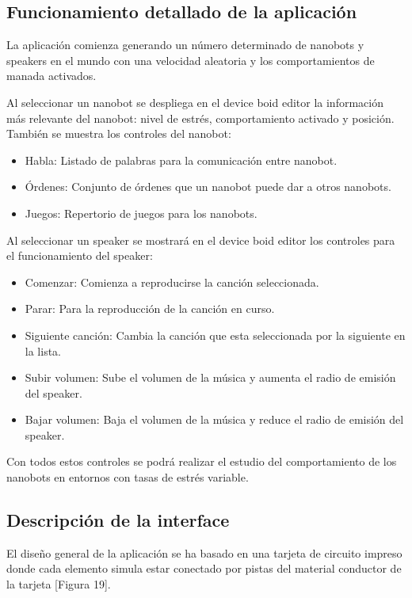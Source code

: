 \subsection{Funcionamiento detallado de la aplicación}
\label{sec:funcionamiento_aplicacion}
La aplicación comienza generando un número determinado de nanobots y speakers en el mundo con una velocidad aleatoria y los comportamientos de manada activados. 

Al seleccionar un nanobot se despliega en el device boid editor la información más relevante del nanobot: nivel de estrés, comportamiento activado y posición. También se muestra los controles del nanobot: 
\begin{itemize}
 \item Habla: Listado de palabras para la comunicación entre nanobot.
 \item Órdenes: Conjunto de órdenes que un nanobot puede dar a otros nanobots.
 \item Juegos: Repertorio de juegos para los nanobots.
\end{itemize}

Al seleccionar un speaker se mostrará en el device boid editor los controles para el funcionamiento del speaker:
\begin{itemize}
 \item Comenzar: Comienza a reproducirse la canción seleccionada.
 \item Parar: Para la reproducción de la canción en curso.
 \item Siguiente canción: Cambia la canción que esta seleccionada por la siguiente en la lista.
 \item Subir volumen: Sube el volumen de la música y aumenta el radio de emisión del speaker.
 \item Bajar volumen: Baja el volumen de la música y reduce el radio de emisión del speaker.
\end{itemize}

Con todos estos controles se podrá realizar el estudio del comportamiento de los nanobots en entornos con tasas de estrés variable.

\subsection{Descripción de la interface}
\label{sec:descricion_interface}
El diseño general de la aplicación se ha basado en una tarjeta de circuito impreso donde cada elemento simula estar conectado por pistas del material conductor de la tarjeta [Figura 19].

